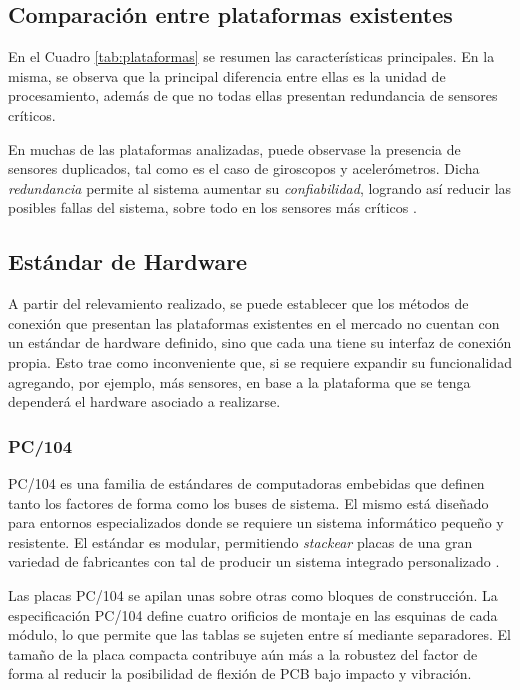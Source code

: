 \subsection{Comparación entre plataformas existentes}


En el Cuadro \ref{tab:plataformas} \cite{yang2016}\cite{raj2016} se resumen las características principales. En la misma, se observa que la principal diferencia entre ellas es la unidad de procesamiento, además de que no todas ellas presentan redundancia de sensores críticos.



En muchas de las plataformas analizadas, puede observase la presencia de sensores duplicados, tal como es el caso de giroscopos y acelerómetros. Dicha \textit{redundancia} permite al sistema aumentar su \textit{confiabilidad}, logrando así reducir las posibles fallas del sistema, sobre todo en los sensores más críticos \cite{petritoli2018}\cite{dhillon1991}.

\subsection{Estándar de Hardware}

A partir del relevamiento realizado, se puede establecer que los métodos de conexión que presentan las plataformas existentes en el mercado no cuentan con un estándar de hardware definido, sino que cada una tiene su interfaz de conexión propia. Esto trae como inconveniente que, si se requiere expandir su funcionalidad agregando, por ejemplo, más sensores, en base a la plataforma que se tenga dependerá el hardware asociado a realizarse.

\subsubsection{PC/104}
PC/104 es una familia de estándares de computadoras embebidas que definen tanto los factores de forma como los buses de sistema. El mismo está diseñado para entornos especializados donde se requiere un sistema informático pequeño y resistente. El estándar es modular, permitiendo \textit{stackear} placas de una gran variedad de fabricantes con tal de producir un sistema integrado personalizado \cite{pc104}.

Las placas PC/104 se apilan unas sobre otras como bloques de construcción. La especificación PC/104 define cuatro orificios de montaje en las esquinas de cada módulo, lo que permite que las tablas se sujeten entre sí mediante separadores. El tamaño de la placa compacta contribuye aún más a la robustez del factor de forma al reducir la posibilidad de flexión de PCB bajo impacto y vibración.

